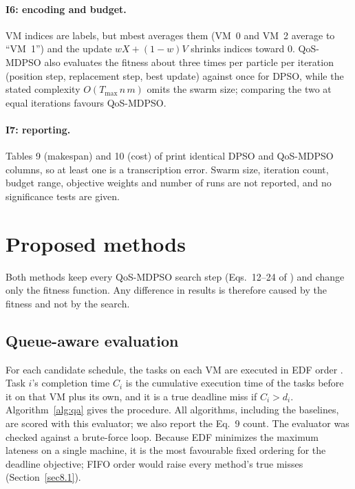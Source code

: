 \documentclass[pdflatex,sn-basic]{sn-jnl}
\theoremstyle{thmstyleone}%
\theoremstyle{thmstyletwo}%
\theoremstyle{thmstylethree}%
\begin{document}
\paragraph{I6: encoding and budget.} VM indices are labels, but mbest averages them (VM~0 and VM~2 average to ``VM~1'') and the update $wX+(1-w)V$ shrinks indices toward 0. QoS-MDPSO also evaluates the fitness about three times per particle per iteration (position step, replacement step, best update) against once for DPSO, while the stated complexity $O(T_{\max}\,n\,m)$ omits the swarm size; comparing the two at equal iterations favours QoS-MDPSO.

\paragraph{I7: reporting.} Tables 9 (makespan) and 10 (cost) of \citet{ouyang2025} print identical DPSO and QoS-MDPSO columns, so at least one is a transcription error. Swarm size, iteration count, budget range, objective weights and number of runs are not reported, and no significance tests are given.

\section{Proposed methods}\label{sec5}
Both methods keep every QoS-MDPSO search step (Eqs.~12--24 of \citet{ouyang2025}) and change only the fitness function. Any difference in results is therefore caused by the fitness and not by the search.

\subsection{Queue-aware evaluation}\label{sec5.1}
For each candidate schedule, the tasks on each VM are executed in EDF order \citep{jackson1955}. Task $i$'s completion time $C_i$ is the cumulative execution time of the tasks before it on that VM plus its own, and it is a true deadline miss if $C_i>d_i$. Algorithm~\ref{alg:qa} gives the procedure. All algorithms, including the baselines, are scored with this evaluator; we also report the Eq.~9 count. The evaluator was checked against a brute-force loop. Because EDF minimizes the maximum lateness on a single machine, it is the most favourable fixed ordering for the deadline objective; FIFO order would raise every method's true misses (Section~\ref{sec8.1}).
\end{document}

